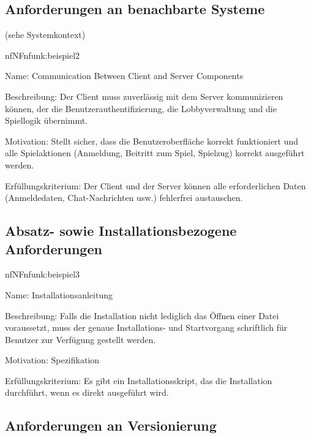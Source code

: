 \subsection{Anforderungen an benachbarte Systeme}
(sehe Systemkontext)

\begin{description}[leftmargin=5em, style=sameline]	
	\begin{lhp}{nf}{NF}{nfunk:beispiel2}
		\item [Name:] Communication Between Client and Server Components
		\item [Beschreibung:] Der Client muss zuverlässig mit dem Server kommunizieren können, der die Benutzerauthentifizierung, die Lobbyverwaltung und die Spiellogik übernimmt. 
		\item [Motivation:] Stellt sicher, dass die Benutzeroberfläche korrekt funktioniert und alle Spielaktionen (Anmeldung, Beitritt zum Spiel, Spielzug) korrekt ausgeführt werden.
		\item [Erfüllungskriterium:] Der Client und der Server können alle erforderlichen Daten (Anmeldedaten, Chat-Nachrichten usw.) fehlerfrei austauschen.
	\end{lhp}
\end{description}

\subsection{Absatz- sowie Installationsbezogene Anforderungen}

\begin{description}[leftmargin=5em, style=sameline]	
	\begin{lhp}{nf}{NF}{nfunk:beispiel3}
		\item [Name:] Installationsanleitung	
		\item [Beschreibung:] Falls die Installation nicht lediglich das Öffnen einer Datei voraussetzt, muss der genaue Installations- und Startvorgang schriftlich für Benutzer zur Verfügung gestellt werden.
		\item [Motivation:] Spezifikation
		\item [Erfüllungskriterium:] Es gibt ein Installationsskript, das die Installation durchführt, wenn es direkt ausgeführt wird.
	\end{lhp}
\end{description}

\subsection{Anforderungen an Versionierung}

